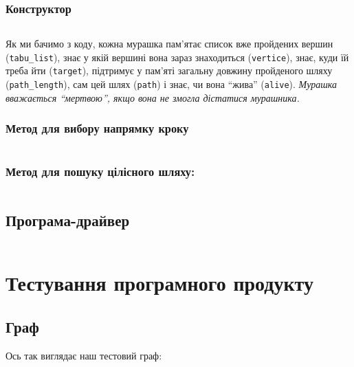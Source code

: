 \documentclass[a4paper, 12pt]{article}
\numberwithin{equation}{section}
\begin{document}
\subsubsection{Конструктор}

\inputminted[firstline=6, lastline=13]{python}{../../code/salesman/main.py}

Як ми бачимо з коду, кожна мурашка пам'ятає список вже пройдених вершин (\verb|tabu_list|), знає у якій вершині вона зараз знаходиться (\verb|vertice|), знає, куди їй треба йти (\verb|target|), підтримує у пам'яті загальну довжину пройденого шляху (\verb|path_length|), сам цей шлях (\verb|path|) і знає, чи вона ``жива'' (\verb|alive|). \textit{Мурашка вважається ``мертвою'', якщо вона не змогла дістатися мурашника.}

\subsubsection{Метод для вибору напрямку кроку}

\inputminted[firstline=15, lastline=44]{python}{../../code/salesman/main.py}

\subsubsection{Метод для пошуку цілісного шляху:}

\inputminted[firstline=46, lastline=52]{python}{../../code/salesman/main.py}

\subsection{Програма-драйвер}

\inputminted[firstline=82, lastline=91]{python}{../../code/salesman/main.py}

\section{Тестування програмного продукту}

\subsection{Граф}

Ось так виглядає наш тестовий граф:
\begin{figure}[H]
    \centering
\end{figure}
\end{document}
